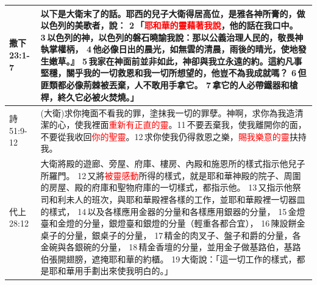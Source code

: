 \begin{table}[H]
\begin{tabular}{p{6em}p{40em}}

撒下23:1-7&以下是大衛末了的話。耶西的兒子大衛得居高位，是雅各神所膏的，做以色列的美歌者，說： 2 「\textcolor{red}{耶和華的靈藉著我說}，他的話在我口中。 3 以色列的神，以色列的磐石曉諭我說：那以公義治理人民的，敬畏神執掌權柄， 4 他必像日出的晨光，如無雲的清晨，雨後的晴光，使地發生嫩草。』 5 我家在神面前並非如此，神卻與我立永遠的約。這約凡事堅穩，關乎我的一切救恩和我一切所想望的，他豈不為我成就嗎？ 6 但匪類都必像荊棘被丟棄，人不敢用手拿它。 7 拿它的人必帶鐵器和槍桿，終久它必被火焚燒。」\\  \midrule

詩51:9-12&(大衛)求你掩面不看我的罪，塗抹我一切的罪孽。神啊，求你為我造清潔的心，使我裡面\textcolor{red}{重新有正直的靈}。11 不要丟棄我，使我離開你的面，不要從我收回\textcolor{red}{你的聖靈}。12 求你使我仍得救恩之樂，\textcolor{red}{賜我樂意的靈}扶持我。\\  \midrule
代上28:12&大衛將殿的遊廊、旁屋、府庫、樓房、內殿和施恩所的樣式指示他兒子所羅門。 12 又將\textcolor{red}{被靈感動}所得的樣式，就是耶和華神殿的院子、周圍的房屋、殿的府庫和聖物府庫的一切樣式，都指示他。 13 又指示他祭司和利未人的班次，與耶和華殿裡各樣的工作，並耶和華殿裡一切器皿的樣式， 14 以及各樣應用金器的分量和各樣應用銀器的分量， 15 金燈臺和金燈的分量，銀燈臺和銀燈的分量（輕重各都合宜）， 16 陳設餅金桌子的分量，銀桌子的分量， 17 精金的肉叉子、盤子和爵的分量，各金碗與各銀碗的分量， 18 精金香壇的分量，並用金子做基路伯，基路伯張開翅膀，遮掩耶和華的約櫃。 19 大衛說：「這一切工作的樣式，都是耶和華用手劃出來使我明白的。」
\\\bottomrule
\end{tabular}  
\end{table}





